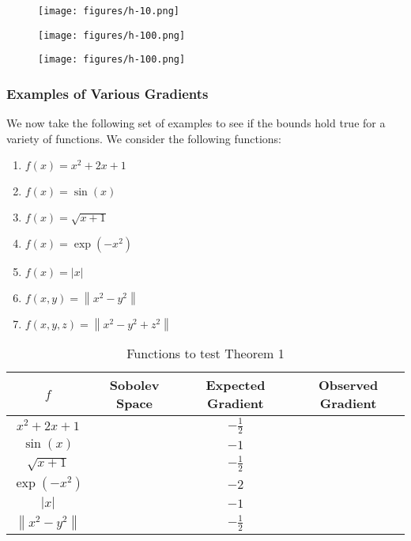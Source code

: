 \documentclass[11pt,a4paper]{article}
\theoremstyle{plain}
\theoremstyle{definition}
\theoremstyle{remark}
\begin{document}
\begin{figure}[h]
    \centering
    \texttt{[image: figures/h-10.png]}
    \caption{}
    \label{fig:}
\end{figure}
\begin{figure}[h]
    \centering
    \texttt{[image: figures/h-100.png]}
    \caption{}
    \label{fig:}
\end{figure}
\begin{figure}[h]
    \centering
    \texttt{[image: figures/h-100.png]}
    \caption{}
    \label{fig:}
\end{figure}

\subsubsection{Examples of Various Gradients}

We now take the following set of examples to see if the bounds hold true for a variety of functions. We consider the following functions:

\begin{enumerate}
    \item \( f(x) = x^{2} + 2x + 1 \)
    \item \( f(x) = \sin(x) \)
    \item \( f(x) = \sqrt{x+1} \)
    \item \(f(x) = \exp(-x^{2} )\) 
    \item \(f(x) = \left\vert x \right\vert \) 
    \item \(f(x,y ) = \left\lVert x^{2} -y^{2} \right\rVert \)
    \item \(f(x,y,z) = \left\lVert x^{2} - y^{2} + z^{2} \right\rVert \)
\end{enumerate}


\begin{table}[h]
    \centering
    \begin{tabular}{c|c|c|c}
        \toprule
            \(f\)  & Sobolev Space & Expected Gradient & Observed Gradient  \\
        \midrule
            \(x^{2}  + 2x + 1\)  &   & \(-\frac{1}{2}\)   &   \\
            \(\sin (x)\)  &   & \(-1\) &   \\
            \(\sqrt{x+1} \)  &   & \(-\frac{1}{2}\)   &   \\
            \(\exp (-x^{2})\)  &   & \(-2\)  &   \\
            \(\left\vert x \right\vert \)  &   & \(-1\)  &   \\
            \(\left\lVert x^{2} -y^{2} \right\rVert \)  &   & \(-\frac{1}{2}\)  &   \\
        \bottomrule
    \end{tabular}
    \caption{Functions to test Theorem 1}
    \label{tab:label}
\end{table}
\end{document}
